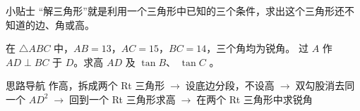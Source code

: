 \documentclass{exam-zh}
\begin{document}

\begin{eduAuxItem}{小贴士}
“解三角形”就是利用一个三角形中已知的三个条件，求出这个三角形还不知道的边、角或高。
\end{eduAuxItem}


\begin{eduProblemBlock}[例题 1]
\noindent
\begin{minipage}[t]{\dimexpr\linewidth-70mm-6mm\relax}
\vspace{0pt}
在 $\triangle ABC$ 中，$AB=13$，$AC=15$，$BC=14$，三个角均为锐角。
过 $A$ 作 $AD\perp BC$ 于 $D$。求高 $AD$ 及 $\tan B$、 $\tan C$ 。

\end{minipage}\hfill
\begin{diagramcoltikz}{70mm}{先看三条已知边；高要由我们自己作出。}
}
\end{diagramcoltikz}
\end{eduProblemBlock}





\begin{eduAuxItem}{思路导航}
作高，拆成两个 Rt 三角形$\;\to\;$设底边分段，不设高$\;\to\;$双勾股消去同一个 $AD^2$$\;\to\;$回到一个 Rt 三角形求高$\;\to\;$在两个 Rt 三角形中求锐角\end{eduAuxItem}
\end{document}
